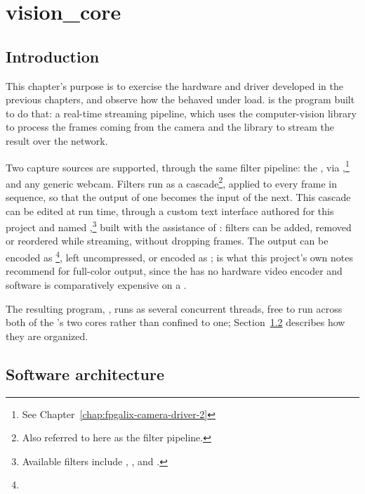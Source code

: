 \chapter{vision\_core}
\label{chap:fpgalix-vision-core}

\section{Introduction}
\label{sec:fpgalix-vision-intro}

This chapter's purpose is to exercise the hardware and driver developed in the previous chapters, and observe how the  behaved under load.  is the program built to do that: a real-time streaming pipeline, which uses the  computer-vision library to process the frames coming from the camera and the  library to stream the result over the network.

Two capture sources are supported, through the same filter pipeline: the , via ,\footnote{See Chapter~\ref{chap:fpgalix-camera-driver-2}} and any generic  webcam. Filters run as a cascade\footnote{Also referred to here as the filter pipeline.}, applied to every frame in sequence, so that the output of one becomes the input of the next. This cascade can be edited at run time, through a custom text interface authored for this project and named ,\footnote{Available filters include , ,  and .} built with the assistance of : filters can be added, removed or reordered while streaming, without dropping frames. The output can be encoded as \footnote{}, left uncompressed, or encoded as ;  is what this project's own notes recommend for full-color output, since the  has no hardware video encoder and software  is comparatively expensive on a .

The resulting program, , runs as several concurrent threads, free to run across both of the 's two  cores rather than confined to one; Section~\ref{sec:fpgalix-vision-architecture} describes how they are organized.

\section{Software architecture}
\label{sec:fpgalix-vision-architecture}

